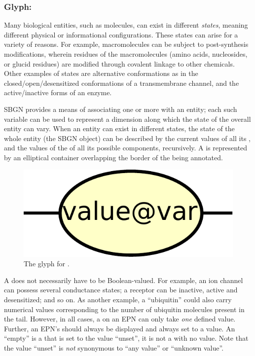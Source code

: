\subsubsection{Glyph: }
\label{sec:stateVariable}

Many biological entities, such as molecules, can exist in different \emph{states}, meaning different physical or informational configurations.  These states can arise for a variety of reasons.  For example, macromolecules can be subject to post-synthesis modifications, wherein residues of the macromolecules (amino acids, nucleosides, or glucid residues) are modified through covalent linkage to other chemicals.  Other examples of states are alternative conformations as in the closed/open/desensitized conformations of a transmembrane channel, and the active/inactive forms of an enzyme.

SBGN provides a means of associating one or more  with an entity; each such variable can be used to represent a dimension along which the state of the overall entity can vary.  When an entity can exist in different states, the state of the whole entity (\ie the SBGN object) can be described by the current values of all its , and the values of the  of all its possible components, recursively. A  is represented by an elliptical container overlapping the border of the  being annotated.

\begin{figure}[htb]
  \centering
  \includegraphics[scale = 0.3, trim = 0 0 0 0.25in]{le_images/stateVariable}
  \caption{The \PD glyph for .}
  \label{fig:state-var}
\end{figure}
 
A  does not necessarily have to be Boolean-valued.  For example, an ion channel can possess several conductance states; a receptor can be inactive, active and desensitized; and so on.  As another example, a  ``ubiquitin'' could also carry numerical values corresponding to the number of ubiquitin molecules present in the tail.  However, in all cases, a  on an EPN can only take \emph{one} defined value.  Further, an EPN's  should always be displayed and always set to a value.  An ``empty''  is a  that is set to the value ``unset'', it is not a  with no value. Note that the value ``unset'' is \emph{not} synonymous to ``any value'' or ``unknown value''.



